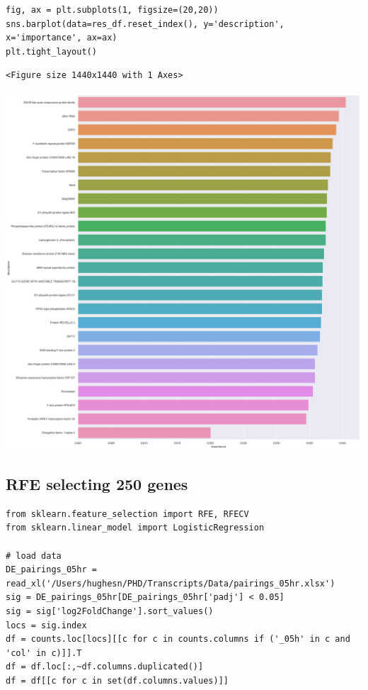 \documentclass[11pt]{article}
\begin{document}
\begin{verbatim}
fig, ax = plt.subplots(1, figsize=(20,20))
sns.barplot(data=res_df.reset_index(), y='description', x='importance', ax=ax)
plt.tight_layout()
\end{verbatim}

\begin{verbatim}
<Figure size 1440x1440 with 1 Axes>
\end{verbatim}


\begin{center}
\includegraphics[width=.9\linewidth]{obipy-resources/93e2fbf76ed477962282ae99767b8408de4d3ed9/632b536b1900f336a7c3395fa110131ed5a5980a.png}
\end{center}


\subsection{RFE selecting 250 genes}
\label{sec:orgc3852db}
\begin{verbatim}
from sklearn.feature_selection import RFE, RFECV
from sklearn.linear_model import LogisticRegression

# load data
DE_pairings_05hr = read_xl('/Users/hughesn/PHD/Transcripts/Data/pairings_05hr.xlsx')
sig = DE_pairings_05hr[DE_pairings_05hr['padj'] < 0.05]
sig = sig['log2FoldChange'].sort_values()
locs = sig.index
df = counts.loc[locs][[c for c in counts.columns if ('_05h' in c and 'col' in c)]].T
df = df.loc[:,~df.columns.duplicated()]
df = df[[c for c in set(df.columns.values)]]
\end{verbatim}
\end{document}
